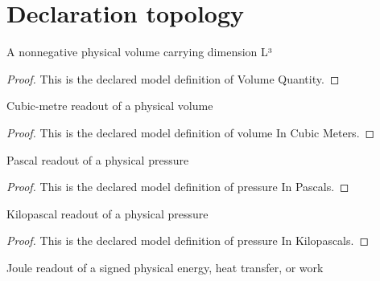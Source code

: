 \section{Declaration topology}
\begin{definition}
  \label{def:physics:phyx-mini-0425:phyxminiproblems-problemphyxmini0425-volumequantity}
  A nonnegative physical volume carrying dimension L³
\end{definition}
\begin{proof}
  This is the declared model definition of Volume Quantity.
\end{proof}
\begin{definition}
  \label{def:physics:phyx-mini-0425:phyxminiproblems-problemphyxmini0425-volumeincubicmeters}
  Cubic-metre readout of a physical volume
\end{definition}
\begin{proof}
  This is the declared model definition of volume In Cubic Meters.
\end{proof}
\begin{definition}
  \label{def:physics:phyx-mini-0425:phyxminiproblems-problemphyxmini0425-pressureinpascals}
  Pascal readout of a physical pressure
\end{definition}
\begin{proof}
  This is the declared model definition of pressure In Pascals.
\end{proof}
\begin{definition}
  \label{def:physics:phyx-mini-0425:phyxminiproblems-problemphyxmini0425-pressureinkilopascals}
  Kilopascal readout of a physical pressure
\end{definition}
\begin{proof}
  This is the declared model definition of pressure In Kilopascals.
\end{proof}
\begin{definition}
  \label{def:physics:phyx-mini-0425:phyxminiproblems-problemphyxmini0425-energyinjoules}
  Joule readout of a signed physical energy, heat transfer, or work
\end{definition}
